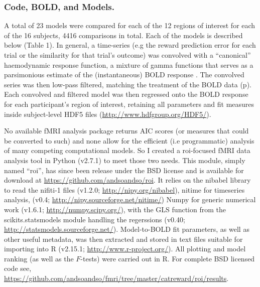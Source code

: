 \documentclass[doc,12pt]{apa}        %
\begin{document}
\subsubsection{Code, BOLD, and Models.}
\label{sub:cmb}
A total of 23 models were compared for each of the 12 regions of interest for each of the 16 subjects, 4416 comparisons in total.  Each of the models is described below (Table 1).  In general, a time-series (e.g the reward prediction error for each trial or the similarity for that trial's outcome) was convolved with a ``canonical''  haemodynamic response function, a mixture of gamma functions that serves as a parsimonious estimate of the (instantaneous) BOLD response \cite{Friston:1998p2022}.  The convolved series was then low-pass filtered, matching the treatment of the BOLD data (p\pageref{subsub:preprocessed}).  Each convolved and filtered model was then regressed onto the BOLD response for each participant's region of interest, retaining all parameters and fit measures inside subject-level HDF5 files (\url{http://www.hdfgroup.org/HDF5/}).  

No available fMRI analysis package returns AIC scores (or measures that could be converted to such) and none allow for the efficient (i.e programmatic) analysis of many competing computational models. So I created a roi-focused fMRI data analysis tool in Python (v2.7.1) to meet those two needs.  This module, simply named ``roi'', has since been release under the BSD license and is available for download at \url{https://github.com/andsoandso/roi}. It relies on the nibabel library to read the nifiti-1 files  (v1.2.0; \url{http://nipy.org/nibabel}), nitime for timeseries analysis, (v0.4; \url{http://nipy.sourceforge.net/nitime/}) Numpy for generic numerical work (v1.6.1; \url{http://numpy.scipy.org/}), with the GLS function from the scikits.statsmodels module handling the regerssions (v0.40; \url{http://statsmodels.sourceforge.net/}).  Model-to-BOLD fit parameters, as well as other useful metadata, was then extracted and stored in text files suitable for importing into R (v2.15.1; \url{http://www.r-project.org/}).  All plotting and model ranking (as well as the $F$-tests) were carried out in R.  For complete BSD licensed code see, \url{https://github.com/andsoandso/fmri/tree/master/catreward/roi/results}.
\end{document}
